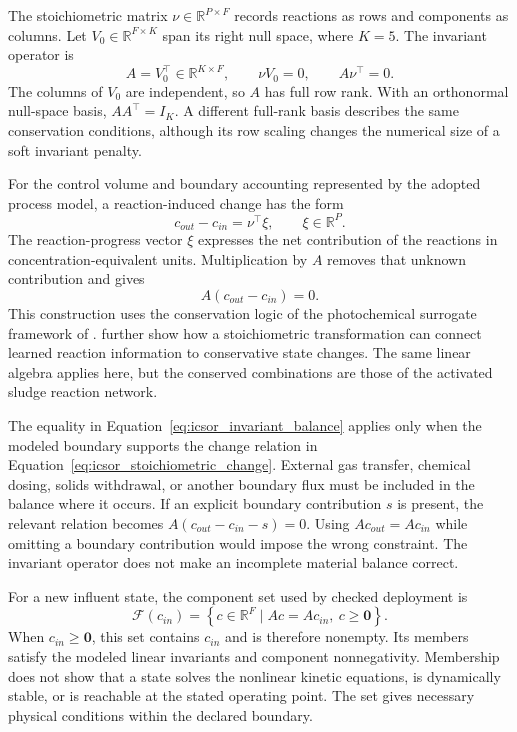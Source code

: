 The stoichiometric matrix \(\nu\in\mathbb{R}^{P\times F}\) records reactions as rows and components as columns. Let \(V_0\in\mathbb{R}^{F\times K}\) span its right null space, where \(K=5\). The invariant operator is
\begin{equation}
\label{eq:icsor_invariant_operator}
A=V_0^\top\in\mathbb{R}^{K\times F},
\qquad \nu V_0=0,
\qquad A\nu^\top=0.
\end{equation}
The columns of \(V_0\) are independent, so \(A\) has full row rank. With an orthonormal null-space basis, \(AA^\top=I_K\). A different full-rank basis describes the same conservation conditions, although its row scaling changes the numerical size of a soft invariant penalty.

For the control volume and boundary accounting represented by the adopted process model, a reaction-induced change has the form
\begin{equation}
\label{eq:icsor_stoichiometric_change}
c_{out}-c_{in}=\nu^\top\xi,
\qquad \xi\in\mathbb{R}^{P}.
\end{equation}
The reaction-progress vector \(\xi\) expresses the net contribution of the reactions in concentration-equivalent units. Multiplication by \(A\) removes that unknown contribution and gives
\begin{equation}
\label{eq:icsor_invariant_balance}
A(c_{out}-c_{in})=0.
\end{equation}
This construction uses the conservation logic of the photochemical surrogate framework of \citet{SturmWexler2020}. \citet{SturmWexler2022} further show how a stoichiometric transformation can connect learned reaction information to conservative state changes. The same linear algebra applies here, but the conserved combinations are those of the activated sludge reaction network.

The equality in Equation~\eqref{eq:icsor_invariant_balance} applies only when the modeled boundary supports the change relation in Equation~\eqref{eq:icsor_stoichiometric_change}. External gas transfer, chemical dosing, solids withdrawal, or another boundary flux must be included in the balance where it occurs. If an explicit boundary contribution \(s\) is present, the relevant relation becomes \(A(c_{out}-c_{in}-s)=0\). Using \(Ac_{out}=Ac_{in}\) while omitting a boundary contribution would impose the wrong constraint. The invariant operator does not make an incomplete material balance correct.

For a new influent state, the component set used by checked deployment is
\begin{equation}
\label{eq:icsor_feasible_set}
\mathcal{F}(c_{in})=
\left\{c\in\mathbb{R}^{F}\mid Ac=Ac_{in},\ c\geq\mathbf{0}\right\}.
\end{equation}
When \(c_{in}\geq\mathbf{0}\), this set contains \(c_{in}\) and is therefore nonempty. Its members satisfy the modeled linear invariants and component nonnegativity. Membership does not show that a state solves the nonlinear kinetic equations, is dynamically stable, or is reachable at the stated operating point. The set gives necessary physical conditions within the declared boundary.

